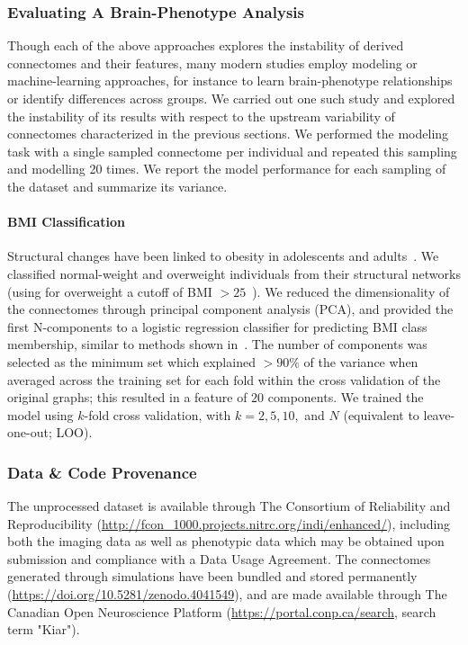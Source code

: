 \documentclass[fleqn,10pt]{SelfArx} %
\begin{document}
\subsubsection*{Evaluating A Brain-Phenotype Analysis}
Though each of the above approaches explores the instability of derived connectomes and their features, many modern
studies employ modeling or machine-learning approaches, for instance to learn brain-phenotype relationships or identify
differences across groups. We carried out one such study and explored the instability of its results with respect to
the upstream variability of connectomes characterized in the previous sections. We performed the modeling task with a
single sampled connectome per individual and repeated this sampling and modelling 20 times. We report the model
performance for each sampling of the dataset and summarize its variance.

\paragraph{BMI Classification} Structural changes have been linked to obesity in adolescents and
adults~\cite{Raji2010-lh}. We classified normal-weight and overweight individuals from their structural networks (using
for overweight a cutoff of BMI $> 25$~\cite{Gupta2015-ap}). We reduced the dimensionality of the connectomes through
principal component analysis (PCA), and provided the first N-components to a logistic regression classifier for
predicting BMI class membership, similar to methods shown in~\cite{Gupta2015-ap,Park2015-uj}. The number of components
was selected as the minimum set which explained $> 90\%$ of the variance when averaged across the training set for each
fold within the cross validation of the original graphs; this resulted in a feature of $20$ components. We trained the
model using $k$-fold cross validation, with $k = 2, 5, 10,$ and $N$ (equivalent to leave-one-out; LOO).

\subsubsection*{Data \& Code Provenance}
The unprocessed dataset is available through The Consortium of Reliability and Reproducibility
(\url{http://fcon_1000.projects.nitrc.org/indi/enhanced/}), including both the imaging data as well as phenotypic data
which may be obtained upon submission and compliance with a Data Usage Agreement. The connectomes generated through
simulations have been bundled and stored permanently (\url{https://doi.org/10.5281/zenodo.4041549}), and are made
available through The Canadian Open Neuroscience Platform (\url{https://portal.conp.ca/search}, search term "Kiar").
\end{document}
